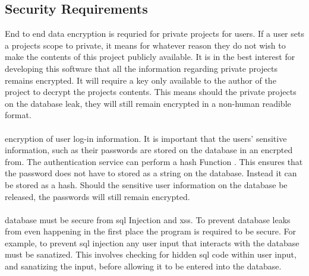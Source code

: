 \documentclass{article}
\newcommand{\comment}[1]{}
\begin{document}
\subsection{Security Requirements}
\comment{
Specify any requirements regarding security or privacy issues surrounding use of the product or protection of the data used or created by the product. Define any user identity authentication requirements. Refer to any external policies or regulations containing security issues that affect the product. Define any security or privacy certifications that must be satisfied.
	}
End to end data \gls{encryption} is requried for private projects for users. If a user sets a projects scope to private, it means for whatever reason they do not wish to make the contents of this project publicly available. It is in the best interest for developing this software that all the information regarding private projects remains encrypted. It will require a \gls{key} only available to the author of the project to decrypt the projects contents. This means should the private projects on the database leak, they will still remain encrypted in a non-human readible format.
\\ \\
\Gls{encryption} of user log-in information. It is important that the users' sensitive information, such as their passwords are stored on the database in an encrpted from. The authentication service can perform a \Gls{hash} Function \parencite{hash20}. This ensures that the password does not have to stored as a \gls{string} on the \gls{database}. Instead it can be stored as a \gls{hash}. Should the sensitive user information on the \gls{database} be released, the passwords will still remain encrypted.
\\ \\
\Gls{database} must be secure from \acrshort{sql} Injection and \acrshort{xss}. To prevent database leaks from even happening in the first place the program is required to be secure. For example, to prevent \acrshort{sql} injection any user input that interacts with the \gls{database} must be sanatized. This involves checking for hidden \acrshort{sql} code within user input, and sanatizing the input, before allowing it to be entered into the \gls{database}.
\\ \\
\end{document}
